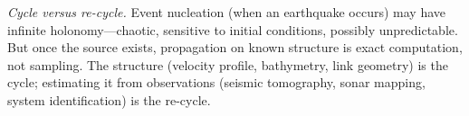 \begin{remark}
\emph{Cycle versus re-cycle.}
Event nucleation (when an earthquake occurs) may have infinite holonomy---chaotic, sensitive to initial conditions, possibly unpredictable. But once the source exists, propagation on known structure is exact computation, not sampling. The structure (velocity profile, bathymetry, link geometry) is the cycle; estimating it from observations (seismic tomography, sonar mapping, system identification) is the re-cycle.
\end{remark}

